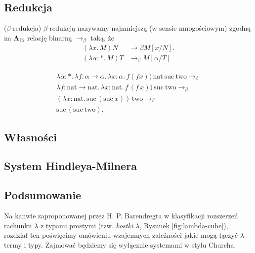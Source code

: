   \subsection{Redukcja}

  \begin{definicja}(\(\beta\)-redukcja)
    \(\beta\)-redukcją nazywamy najmniejszą (w sensie mnogościowym) zgodną na \(\mathbf{\Lambda}_{\mathbb{T}2}\) relację binarną \(\to_\beta\) taką, że
  \begin{align*}
    (\lambda x.\,M)N &\to\beta M[x/N].\\
    (\lambda \alpha:*.\,M) T &\to_\beta M[\alpha/T]
  \end{align*}
  \end{definicja}
  \begin{przyklad}
    \begin{align*}
    \lambda \alpha : *.\,\lambda f:\alpha\to\alpha.\,\lambda x:\alpha.\,f(f x))\,\mathrm{nat\  suc\  two} \to_\beta\\
      \lambda f : \mathrm{nat}\to\mathrm{nat}.\,\lambda x :\mathrm{nat} .\, f\,(f\,x))\, \mathrm{suc\  two} \to_\beta\\
      (\lambda x:\mathrm{nat}.\,\mathrm{suc}\,(\mathrm{suc}\ x))\,\mathrm{two} \to_\beta \\
      \mathrm{suc}\,(\mathrm{suc}\ \mathrm{two}).
    \end{align*}
  \end{przyklad}
\subsection{Własności}
\subsection{System Hindleya-Milnera}
\subsection{Podsumowanie}
Na kanwie zaproponowanej przez H. P. Barendregta w \cite[Rozdział 5]{Barendregt_1992} klasyfikacji rozszerzeń rachunku \(\lambda\) z typami prostymi (tzw. \emph{kostki \(\lambda\)}, Rysunek \ref{fig:lambda-cube}), rozdział ten poświęcimy omówieniu wzajemnych zależności jakie mogą łączyć \(\lambda\)-termy i typy. Zajmować będziemy się wyłącznie systemami w stylu Churcha.

